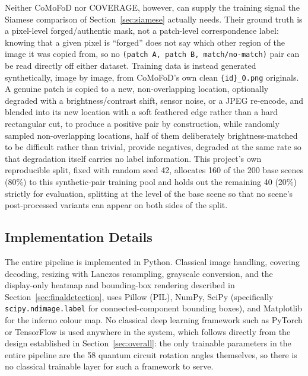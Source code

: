 \documentclass[conference]{IEEEtran}
\begin{document}
Neither CoMoFoD nor COVERAGE, however, can supply the training signal the Siamese comparison of Section~\ref{sec:siamese} actually needs. Their ground truth is a pixel-level forged/authentic mask, not a patch-level correspondence label: knowing that a given pixel is ``forged'' does not say which other region of the image it was copied from, so no \texttt{(patch A, patch B, match/no-match)} pair can be read directly off either dataset. Training data is instead generated synthetically, image by image, from CoMoFoD's own clean \texttt{\{id\}\_O.png} originals. A genuine patch is copied to a new, non-overlapping location, optionally degraded with a brightness/contrast shift, sensor noise, or a JPEG re-encode, and blended into its new location with a soft feathered edge rather than a hard rectangular cut, to produce a positive pair by construction, while randomly sampled non-overlapping locations, half of them deliberately brightness-matched to be difficult rather than trivial, provide negatives, degraded at the same rate so that degradation itself carries no label information. This project's own reproducible split, fixed with random seed 42, allocates 160 of the 200 base scenes (80\%) to this synthetic-pair training pool and holds out the remaining 40 (20\%) strictly for evaluation, splitting at the level of the base scene so that no scene's post-processed variants can appear on both sides of the split.

\subsection{Implementation Details}\label{sec:impl}
The entire pipeline is implemented in Python. Classical image handling, covering decoding, resizing with Lanczos resampling, grayscale conversion, and the display-only heatmap and bounding-box rendering described in Section~\ref{sec:finaldetection}, uses Pillow (PIL), NumPy, SciPy (specifically \texttt{scipy.ndimage.label} for connected-component bounding boxes), and Matplotlib for the inferno colour map. No classical deep learning framework such as PyTorch or TensorFlow is used anywhere in the system, which follows directly from the design established in Section~\ref{sec:overall}: the only trainable parameters in the entire pipeline are the 58 quantum circuit rotation angles themselves, so there is no classical trainable layer for such a framework to serve.
\end{document}
